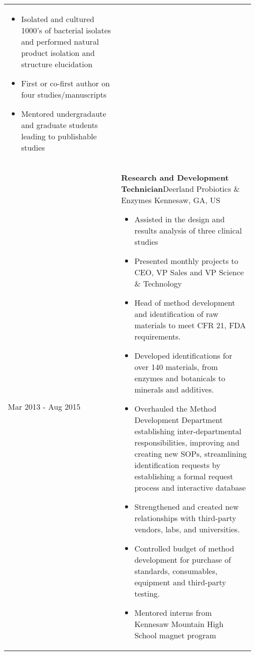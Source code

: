 \documentclass[10pt,a4paper,]{article}
\begin{document}
\begin{longtable}{@{\extracolsep{\fill}}ll}
{\begin{minipage}{0.7\textwidth}
\begin{itemize}[leftmargin=*]
\item Isolated and cultured 1000’s of bacterial isolates and performed natural product isolation and structure elucidation%
\item First or co-first author on four studies/manuscripts%
\item Mentored undergradaute and graduate students leading to publishable studies%
\end{itemize}%
\end{minipage}%
\vspace{1.5\parsep}}\\
Mar 2013 - 
Aug 2015 & \parbox[t]{0.85\textwidth}{%
\textbf{Research and Development Technician}\hfill{Deerland Probiotics \& Enzymes}\newline
  \footnotesize Kennesaw, GA, US\par%
  \normalsize \vspace{0.1cm}\begin{minipage}{0.7\textwidth}%
\begin{itemize}[leftmargin=*]%
\item Assisted in the design and results analysis of three clinical studies%
\item Presented monthly projects to CEO, VP Sales and VP Science \& Technology%
\item Head of method development and identification of raw materials to meet CFR 21, FDA requirements.%
\item Developed identifications for over 140 materials, from enzymes and botanicals to minerals and additives. %
\item Overhauled the Method Development Department establishing inter-departmental responsibilities, improving and creating new SOPs, streamlining identification requests by establishing a formal request  process and interactive database%
\item Strengthened and created new relationships with third-party vendors, labs, and universities. %
\item Controlled budget of method development for purchase of standards, consumables, equipment and third-party testing.%
\item Mentored interns from Kennesaw Mountain High School magnet program%
\end{itemize}%
\end{minipage}%
\vspace{1.5\parsep}}\\
Aug 2008 - 
May 2012 & \parbox[t]{0.85\textwidth}{%
\textbf{Bonner Scholar}\hfill{Bonner Foundation}\newline
}
\end{longtable}
\end{document}
